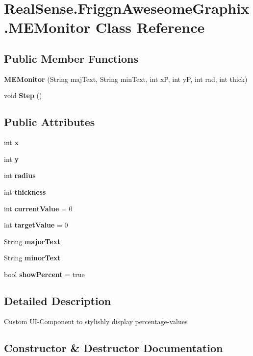 \section{Real\+Sense.\+Friggn\+Aweseome\+Graphix.\+M\+E\+Monitor Class Reference}
\label{class_real_sense_1_1_friggn_aweseome_graphix_1_1_m_e_monitor}
\subsection*{Public Member Functions}
\begin{DoxyCompactItemize}
\item 
\textbf{ M\+E\+Monitor} (String maj\+Text, String min\+Text, int xP, int yP, int rad, int thick)
\item 
void \textbf{ Step} ()
\end{DoxyCompactItemize}
\subsection*{Public Attributes}
\begin{DoxyCompactItemize}
\item 
int \textbf{ x}
\item 
int \textbf{ y}
\item 
int \textbf{ radius}
\item 
int \textbf{ thickness}
\item 
int \textbf{ current\+Value} = 0
\item 
int \textbf{ target\+Value} = 0
\item 
String \textbf{ major\+Text}
\item 
String \textbf{ minor\+Text}
\item 
bool \textbf{ show\+Percent} = true
\end{DoxyCompactItemize}


\subsection{Detailed Description}
Custom U\+I-\/\+Component to stylishly display percentage-\/values 

\subsection{Constructor \& Destructor Documentation}
\mbox{\label{class_real_sense_1_1_friggn_aweseome_graphix_1_1_m_e_monitor_a8df7ffb411949e73cc37344326d325a3}} 
